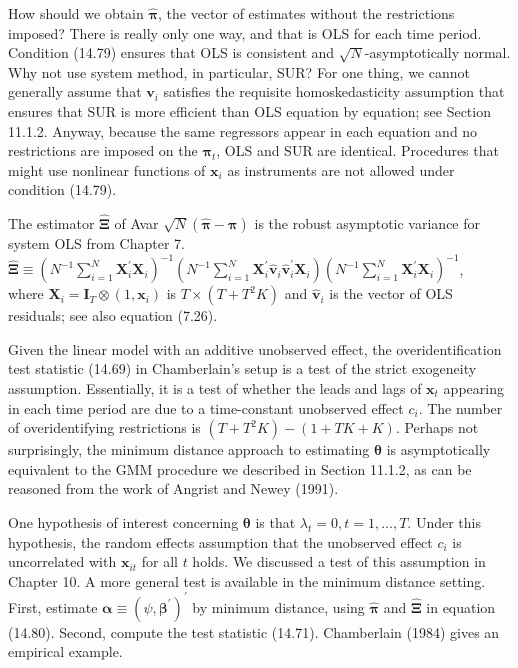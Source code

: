 \documentclass[10pt]{article}
\begin{document}
How should we obtain $\hat{\boldsymbol{\pi}}$, the vector of estimates without the restrictions imposed? There is really only one way, and that is OLS for each time period. Condition (14.79) ensures that OLS is consistent and $\sqrt{N}$-asymptotically normal. Why not use system method, in particular, SUR? For one thing, we cannot generally assume that $\mathbf{v}_{i}$ satisfies the requisite homoskedasticity assumption that ensures that SUR is more efficient than OLS equation by equation; see Section 11.1.2. Anyway, because the same regressors appear in each equation and no restrictions are imposed on the $\boldsymbol{\pi}_{t}$, OLS and SUR are identical. Procedures that might use nonlinear functions of $\mathbf{x}_{i}$ as instruments are not allowed under condition (14.79).

The estimator $\hat{\boldsymbol{\Xi}}$ of Avar $\sqrt{N}(\hat{\boldsymbol{\pi}}-\boldsymbol{\pi})$ is the robust asymptotic variance for system OLS from Chapter 7.\\
$\hat{\boldsymbol{\Xi}} \equiv\left(N^{-1} \sum_{i=1}^{N} \mathbf{X}_{i}^{\prime} \mathbf{X}_{i}\right)^{-1}\left(N^{-1} \sum_{i=1}^{N} \mathbf{X}_{i}^{\prime} \hat{\mathbf{v}}_{i} \hat{\mathbf{v}}_{i}^{\prime} \mathbf{X}_{i}\right)\left(N^{-1} \sum_{i=1}^{N} \mathbf{X}_{i}^{\prime} \mathbf{X}_{i}\right)^{-1}$,\\
where $\mathbf{X}_{i}=\mathbf{I}_{T} \otimes\left(1, \mathbf{x}_{i}\right)$ is $T \times\left(T+T^{2} K\right)$ and $\hat{\mathbf{v}}_{i}$ is the vector of OLS residuals; see also equation (7.26).

Given the linear model with an additive unobserved effect, the overidentification test statistic (14.69) in Chamberlain's setup is a test of the strict exogeneity assumption. Essentially, it is a test of whether the leads and lags of $\mathbf{x}_{t}$ appearing in each time period are due to a time-constant unobserved effect $c_{i}$. The number of overidentifying restrictions is $\left(T+T^{2} K\right)-(1+T K+K)$. Perhaps not surprisingly, the minimum distance approach to estimating $\boldsymbol{\theta}$ is asymptotically equivalent to the GMM procedure we described in Section 11.1.2, as can be reasoned from the work of Angrist and Newey (1991).

One hypothesis of interest concerning $\boldsymbol{\theta}$ is that $\lambda_{t}=0, t=1, \ldots, T$. Under this hypothesis, the random effects assumption that the unobserved effect $c_{i}$ is uncorrelated with $\mathbf{x}_{i t}$ for all $t$ holds. We discussed a test of this assumption in Chapter 10. A more general test is available in the minimum distance setting. First, estimate $\boldsymbol{\alpha} \equiv\left(\psi, \boldsymbol{\beta}^{\prime}\right)^{\prime}$ by minimum distance, using $\hat{\boldsymbol{\pi}}$ and $\hat{\boldsymbol{\Xi}}$ in equation (14.80). Second, compute the test statistic (14.71). Chamberlain (1984) gives an empirical example.
\end{document}
